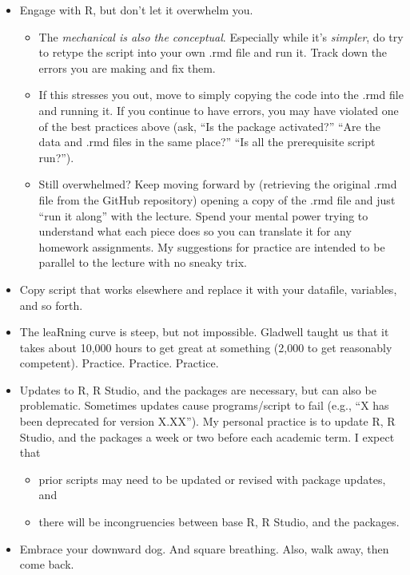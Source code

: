 \documentclass[
  11pt,
]{book}
\providecommand{\tightlist}{%
  \setlength{\itemsep}{0pt}\setlength{\parskip}{0pt}}
\begin{document}
\begin{itemize}
\tightlist
\item
  Engage with R, but don't let it overwhelm you.

  \begin{itemize}
  \tightlist
  \item
    The \emph{mechanical is also the conceptual}. Especially while it's \emph{simpler}, do try to retype the script into your own .rmd file and run it. Track down the errors you are making and fix them.
  \item
    If this stresses you out, move to simply copying the code into the .rmd file and running it. If you continue to have errors, you may have violated one of the best practices above (ask, ``Is the package activated?'' ``Are the data and .rmd files in the same place?'' ``Is all the prerequisite script run?'').
  \item
    Still overwhelmed? Keep moving forward by (retrieving the original .rmd file from the GitHub repository) opening a copy of the .rmd file and just ``run it along'' with the lecture. Spend your mental power trying to understand what each piece does so you can translate it for any homework assignments. My suggestions for practice are intended to be parallel to the lecture with no sneaky trix.
  \end{itemize}
\item
  Copy script that works elsewhere and replace it with your datafile, variables, and so forth.
\item
  The leaRning curve is steep, but not impossible. Gladwell \citeyearpar{gladwell_outliers_2008} taught us that it takes about 10,000 hours to get great at something (2,000 to get reasonably competent). Practice. Practice. Practice.
\item
  Updates to R, R Studio, and the packages are necessary, but can also be problematic. Sometimes updates cause programs/script to fail (e.g., ``X has been deprecated for version X.XX''). My personal practice is to update R, R Studio, and the packages a week or two before each academic term. I expect that

  \begin{itemize}
  \tightlist
  \item
    prior scripts may need to be updated or revised with package updates, and
  \item
    there will be incongruencies between base R, R Studio, and the packages.
  \end{itemize}
\item
  Embrace your downward dog. And square breathing. Also, walk away, then come back.
\end{itemize}
\end{document}
